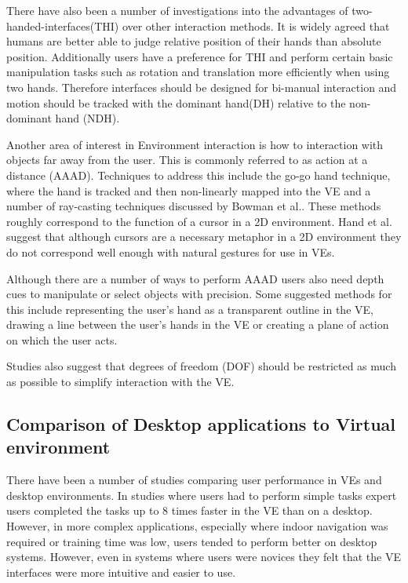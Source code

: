 \documentclass{sig-alternate-05-2015}
\begin{document}
 There have also been a number of investigations into the advantages of two-handed-interfaces(THI) over other interaction methods. It is widely agreed that humans are better able to judge relative position of their hands than absolute position.\cite{Bowman1998, Buxton1986} Additionally users have a preference for THI\cite{Buxton1986} and perform certain basic manipulation tasks such as rotation and translation more efficiently when using two hands\cite{Schultheis2012,Balakrishnan1999}. Therefore interfaces should be designed for bi-manual interaction and motion should be tracked with the dominant hand(DH) relative to the non-dominant hand (NDH)\cite{Hinckley1994}.
 
 Another area of interest in Environment interaction is how to interaction with objects far away from the user. This is commonly referred to as action at a distance (AAAD). Techniques to address this include the go-go hand technique\cite{Poupyrev1996}, where the hand is tracked and then non-linearly mapped into the VE and a number of ray-casting techniques discussed by Bowman et al.\cite{Bowman2001}. These methods roughly correspond to the function of a cursor in a 2D environment. Hand et al. suggest that although cursors are a necessary metaphor in a 2D environment they do not correspond well enough with natural gestures for use in VEs\cite{Hand1997}.
 
 Although there are a number of ways to perform AAAD users also need depth cues to manipulate or select objects with precision.\cite{Schultheis2012} Some suggested methods for this include representing the user's hand as a transparent outline in the VE\cite{Hinckley1994}, drawing a line between the user's hands in the VE\cite{Schultheis2012} or creating a plane of action\cite{Mine2014} on which the user acts.
 
 
 Studies also suggest that degrees of freedom (DOF) should be restricted as much as possible to simplify interaction with the VE.\cite{Bowman2001}

\subsection{Comparison of Desktop applications to Virtual environment}
There have been a number of studies comparing user performance in VEs and desktop environments. In studies where users had to perform simple tasks expert users completed the tasks up to 8 times faster in the VE than on a desktop.\cite{Schultheis2012} However, in more complex applications, especially where indoor navigation was required or training time was low, users tended to perform better on desktop systems\cite{SousaSantos2009}. However, even in systems where users were novices they felt that the VE interfaces were more intuitive and easier to use\cite{Toma2012}.
\end{document}
